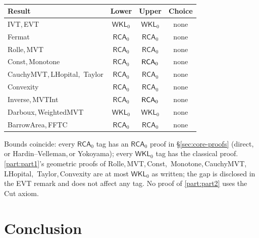 \documentclass[11pt,reqno]{amsart}
\theoremstyle{redplain}
\begin{document}
\begin{center}
{\small \ 
\begin{tabular}{|l|c|c|c|}
\hline
\textbf{Result} & \textbf{Lower} & \textbf{Upper} & \textbf{Choice} \\ \hline
\textsf{IVT},\,\allowbreak \textsf{EVT} & $\mathsf{WKL}_0$ & $\mathsf{WKL}_0$
& none \\ \hline
\textsf{Fermat} & $\mathsf{RCA}_0$ & $\mathsf{RCA}_0$ & none \\ \hline
\textsf{Rolle},\,\allowbreak \textsf{MVT} & $\mathsf{RCA}_0$ & $\mathsf{RCA}%
_0$ & none \\ \hline
\textsf{Const},\,\allowbreak \textsf{Monotone} & $\mathsf{RCA}_0$ & $\mathsf{%
RCA}_0$ & none \\ \hline
\textsf{CauchyMVT},\,\allowbreak \textsf{LHopital},\,\allowbreak \textsf{%
Taylor} & $\mathsf{RCA}_0$ & $\mathsf{RCA}_0$ & none \\ \hline
\textsf{Convexity} & $\mathsf{RCA}_0$ & $\mathsf{RCA}_0$ & none \\ \hline
\textsf{Inverse},\,\allowbreak \textsf{MVTInt} & $\mathsf{RCA}_0$ & $\mathsf{%
RCA}_0$ & none \\ \hline
\textsf{Darboux},\,\allowbreak \textsf{WeightedMVT} & $\mathsf{WKL}_0$ & $%
\mathsf{WKL}_0$ & none \\ \hline
\textsf{BarrowArea},\,\allowbreak \textsf{FFTC} & $\mathsf{RCA}_0$ & $%
\mathsf{RCA}_0$ & none \\ \hline
\end{tabular}
}
\end{center}

\medskip

\noindent {} Bounds coincide: every $\mathsf{RCA}_0$ tag has
an $\mathsf{RCA}_0$ proof in \S \ref{sec:core-proofs} (direct,\,\allowbreak
or Hardin--Velleman,\,\allowbreak or Yokoyama); every $\mathsf{WKL}_0$ tag
has the classical proof. \autoref{part:part1}'s geometric proofs of
Rolle,\,\allowbreak MVT,\,\allowbreak Const,\,\allowbreak
Monotone,\,\allowbreak CauchyMVT,\,\allowbreak LHopital,\,\allowbreak
Taylor,\,\allowbreak Convexity are at most $\mathsf{WKL}_0$ as written; the
gap is disclosed in the EVT remark and does not affect any tag. No proof of %
\autoref{part:part2} uses the Cut axiom.

\section{Conclusion}

\label{sec:conclusion} \begingroup\sloppy
\end{document}
